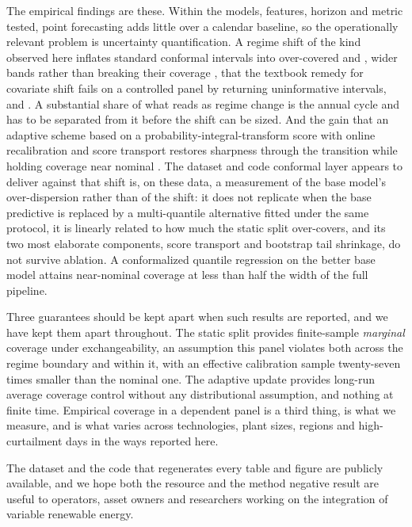 \documentclass[preprint,3p,times]{elsarticle}
\providecommand{\DIFaddtex}[1]{{\protect\color{blue} \sf #1}} %
\providecommand{\DIFdeltex}[1]{{\protect\color{red} \scriptsize #1}} %
\providecommand{\DIFaddbegin}{} %
\providecommand{\DIFaddend}{} %
\providecommand{\DIFdelbegin}{} %
\providecommand{\DIFdelend}{} %
\providecommand{\DIFadd}[1]{\texorpdfstring{\DIFaddtex{#1}}{#1}} %
\providecommand{\DIFdel}[1]{\texorpdfstring{\DIFdeltex{#1}}{}} %
\begin{document}
\DIFadd{The empirical findings are these. Within the models, features, horizon and metric tested, point forecasting adds little over a calendar baseline, so the operationally relevant problem is uncertainty quantification. A regime shift of the kind observed here }\DIFaddend inflates standard conformal intervals into over-covered\DIFdelbegin \DIFdel{and }\DIFdelend \DIFaddbegin \DIFadd{, }\DIFaddend wider bands rather than breaking their coverage\DIFdelbegin \DIFdel{, that the textbook remedy for covariate shift fails on a controlled panel by returning uninformative intervals, and }\DIFdelend \DIFaddbegin \DIFadd{. A substantial share of what reads as regime change is the annual cycle and has to be separated from it before the shift can be sized. And the gain }\DIFaddend that an adaptive \DIFdelbegin \DIFdel{scheme based on a probability-integral-transform score with online recalibration and score transport restores sharpness through the transition while holding coverage near nominal . The dataset and code }\DIFdelend \DIFaddbegin \DIFadd{conformal layer appears to deliver against that shift is, on these data, a measurement of the base model's over-dispersion rather than of the shift: it does not replicate when the base predictive is replaced by a multi-quantile alternative fitted under the same protocol, it is linearly related to how much the static split over-covers, and its two most elaborate components, score transport and bootstrap tail shrinkage, do not survive ablation. A conformalized quantile regression on the better base model attains near-nominal coverage at less than half the width of the full pipeline.
}

\DIFadd{Three guarantees should be kept apart when such results are reported, and we have kept them apart throughout. The static split provides finite-sample \emph{marginal} coverage under exchangeability, an assumption this panel violates both across the regime boundary and within it, with an effective calibration sample twenty-seven times smaller than the nominal one. The adaptive update provides long-run average coverage control without any distributional assumption, and nothing at finite time. Empirical coverage in a dependent panel is a third thing, is what we measure, and is what varies across technologies, plant sizes, regions and high-curtailment days in the ways reported here.
}

\DIFadd{The dataset and the code that regenerates every table and figure }\DIFaddend are publicly available, and we hope both the resource and the \DIFdelbegin \DIFdel{method }\DIFdelend \DIFaddbegin \DIFadd{negative result }\DIFaddend are useful to operators, asset owners and researchers working on the integration of variable renewable energy.
\end{document}
